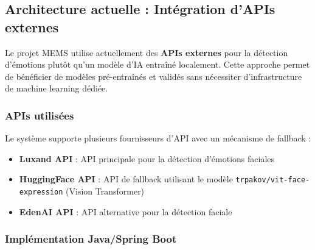 \documentclass[a4paper,11pt]{report}
\begin{document}
\subsection{Architecture actuelle : Intégration d'APIs externes}

Le projet MEMS utilise actuellement des \textbf{APIs externes} pour la détection d'émotions plutôt qu'un modèle d'IA entraîné localement. Cette approche permet de bénéficier de modèles pré-entraînés et validés sans nécessiter d'infrastructure de machine learning dédiée.

\subsubsection{APIs utilisées}

Le système supporte plusieurs fournisseurs d'API avec un mécanisme de fallback :

\begin{itemize}
    \item \textbf{Luxand API} : API principale pour la détection d'émotions faciales
    \item \textbf{HuggingFace API} : API de fallback utilisant le modèle \texttt{trpakov/vit-face-expression} (Vision Transformer)
    \item \textbf{EdenAI API} : API alternative pour la détection faciale
\end{itemize}

\subsubsection{Implémentation Java/Spring Boot}
\end{document}

